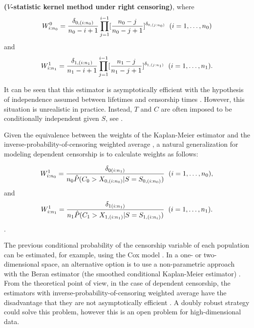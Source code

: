 \documentclass[11pt]{article}
\begin{document}
\begin{appendices}
\textbf{($V$-statistic kernel method under right censoring)},
where
\begin{equation}
W^{0}_{{i:n_0}}= \frac{\delta_{0,(i:n_0)}}{n_0-i+1}\prod_{j=1}^{i-1}[\frac{n_0-j}{n_0-j+1}]^{\delta_{0,(j:n_0)}}
\hspace{0.2cm}   (i=1,\dots,n_0)
\end{equation}
and
\begin{equation}
W^{1}_{{i:n_1}}= \frac{\delta_{1,(i:n_1)}}{n_1-i+1}\prod_{j=1}^{i-1}[\frac{n_1-j}{n_1-j+1}]^{\delta_{1,(j:n_1)}} \hspace{0.2cm}   (i=1,\dots,n_1).
\end{equation}



It can be seen that this estimator is asymptotically efficient with the hypothesis of independence assumed between lifetimes and censorship times \cite{gerds2017kaplan}.  However, this situation is unrealistic in practice.  	Instead, $T$ and $C$ are often imposed to be  conditionally independent given   $S$, see \cite{fan1994censored}. 

Given the equivalence between the weights of the Kaplan-Meier estimator and the inverse-probability-of-censoring weighted average 
\cite{satten2001kaplan}, a natural generalization for modeling dependent censorship is to calculate weights as follows:

\begin{equation}
W^{1}_{{i:n_0}}= \frac{\delta_{0(i:n_1)}}{n_0\hat{P}(C_0>X_{0,(i:n_0)}|S=S_{0,(i:n_0)})} \hspace{0.2cm}   (i=1,\dots,n_0),
\end{equation}
and
\begin{equation}
W^{1}_{{i:n_1}}= \frac{\delta_{1(i:n_1)}}{n_1 \hat{P}(C_1>X_{1,(i:n_1)}|S=S_{1,(i:n_i)})} \hspace{0.2cm}   (i=1,\dots,n_1).
\end{equation}.

The previous conditional probability of the censorship variable of each population can be estimated, for example, using the Cox model \cite{gerds2017kaplan}. In   a one- or two-dimensional space, an alternative option is to use a non-parametric approach with the Beran estimator (the smoothed conditional Kaplan-Meier estimator) \cite{gonzalez1994asymptotic}. From the theoretical point of view, in the case of dependent censorship, the estimators with inverse-probability-of-censoring weighted average   have the disadvantage that they are  not  asymptotically efficient  \cite{van2002locally}. A doubly robust strategy \cite{tsiatis2007semiparametric,rubin2007doubly} could solve this problem, however this is an open problem for high-dimensional data.





\end{appendices}
\end{document}
